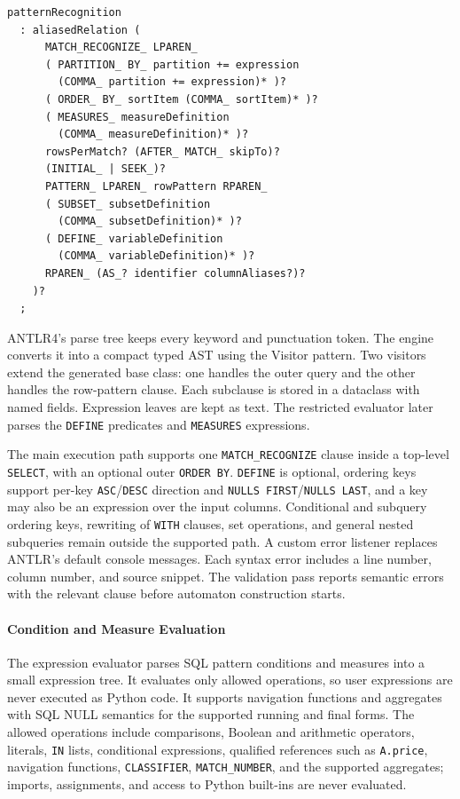 \documentclass[preprint,12pt,times,a4paper]{elsarticle}
\begin{document}
\begin{lstlisting}[language={},basicstyle=\ttfamily\scriptsize,caption={The \texttt{patternRecognition} rule adapted from the community Trino ANTLR4 grammar},label={lst:grammar}]
patternRecognition
  : aliasedRelation (
      MATCH_RECOGNIZE_ LPAREN_
      ( PARTITION_ BY_ partition += expression
        (COMMA_ partition += expression)* )?
      ( ORDER_ BY_ sortItem (COMMA_ sortItem)* )?
      ( MEASURES_ measureDefinition
        (COMMA_ measureDefinition)* )?
      rowsPerMatch? (AFTER_ MATCH_ skipTo)?
      (INITIAL_ | SEEK_)?
      PATTERN_ LPAREN_ rowPattern RPAREN_
      ( SUBSET_ subsetDefinition
        (COMMA_ subsetDefinition)* )?
      ( DEFINE_ variableDefinition
        (COMMA_ variableDefinition)* )?
      RPAREN_ (AS_? identifier columnAliases?)?
    )?
  ;
\end{lstlisting}

ANTLR4's parse tree keeps every keyword and punctuation token. The engine
converts it into a compact typed AST using the
Visitor pattern. Two visitors extend the generated base class: one handles
the outer query and the other handles the row-pattern clause. Each subclause
is stored in a dataclass with named fields. Expression leaves are kept as
text. The restricted evaluator later parses the \texttt{DEFINE} predicates
and \texttt{MEASURES} expressions.

The main execution path supports one \texttt{MATCH\_RECOGNIZE} clause inside a top-level
\texttt{SELECT}, with an optional outer \texttt{ORDER BY}. \texttt{DEFINE} is
optional, ordering keys support per-key \texttt{ASC}/\texttt{DESC} direction and
\texttt{NULLS FIRST}/\texttt{NULLS LAST}, and a key may also be an expression
over the input columns. Conditional and subquery ordering keys, rewriting of
\texttt{WITH} clauses, set operations, and general nested subqueries remain
outside the supported path. A custom error listener replaces ANTLR's default
console messages. Each syntax error includes a line number, column number,
and source snippet. The validation pass reports semantic errors with the
relevant clause before automaton construction starts.

\paragraph{Condition and Measure Evaluation}
The expression evaluator parses SQL pattern conditions and measures into a
small expression tree. It evaluates only allowed operations, so user
expressions are never executed as Python code. It supports navigation
functions and aggregates with SQL NULL semantics for the supported running
and final forms. The allowed operations include comparisons, Boolean and arithmetic
operators, literals, \texttt{IN} lists, conditional expressions, qualified
references such as \texttt{A.price}, navigation functions,
\texttt{CLASSIFIER}, \texttt{MATCH\_NUMBER}, and the supported aggregates;
imports, assignments, and access to Python built-ins are never evaluated.
\end{document}
